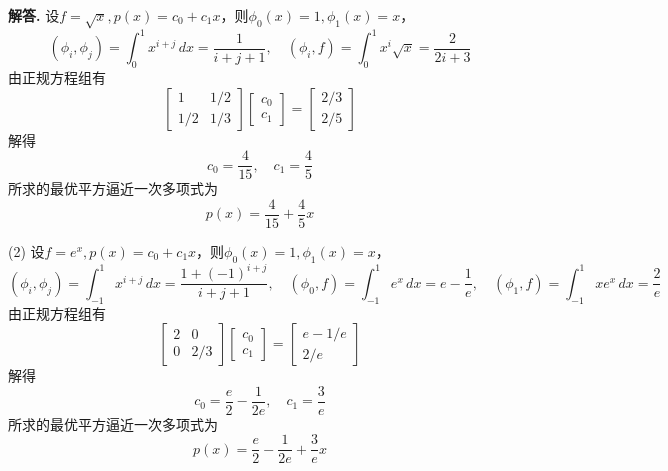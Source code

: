 \documentclass[12pt, a4paper, oneside]{ctexart}
\newenvironment{solution}{\par\noindent\textbf{解答. }}{\bigskip\par}
\begin{document}
\begin{solution}
    设$f=\sqrt{x}, p(x) = c_0+c_1x$，则$\phi_0(x) = 1,\phi_1(x) = x$，
    \begin{equation*}
        (\phi_i,\phi_j) = \int_0^1x^{i+j}\,dx = \frac{1}{i+j+1},\quad(\phi_i, f)=\int_0^1x^i\sqrt{x}=\frac{2}{2i+3}
    \end{equation*}
    由正规方程组有
    \begin{equation*}
        \left[\begin{matrix}
            1&1/2\\1/2&1/3
        \end{matrix}\right]\left[\begin{matrix}
            c_0\\c_1
        \end{matrix}\right]=\left[\begin{matrix}
            2/3\\2/5
        \end{matrix}\right]
    \end{equation*}
    解得
    \begin{equation*}
        c_0 = \frac{4}{15},\quad c_1 = \frac{4}{5}
    \end{equation*}
    所求的最优平方逼近一次多项式为
    \begin{equation*}
        p(x) = \frac{4}{15}+\frac{4}{5}x
    \end{equation*}

    (2) 设$f=e^{x}, p(x) = c_0+c_1x$，则$\phi_0(x) = 1,\phi_1(x) = x$，
    \begin{equation*}
        (\phi_i,\phi_j) = \int_{-1}^1x^{i+j}\,dx = \frac{1+(-1)^{i+j}}{i+j+1},\quad(\phi_0, f)=\int_{-1}^1e^x\,dx = e-\frac{1}{e},\quad (\phi_1,f)=\int_{-1}^1xe^x\,dx=\frac{2}{e}
    \end{equation*}
    由正规方程组有
    \begin{equation*}
        \left[\begin{matrix}
            2&0\\0&2/3
        \end{matrix}\right]\left[\begin{matrix}
            c_0\\c_1
        \end{matrix}\right]=\left[\begin{matrix}
            e-1/e\\2/e
        \end{matrix}\right]
    \end{equation*}
    解得
    \begin{equation*}
        c_0 = \frac{e}{2}-\frac{1}{2e},\quad c_1 = \frac{3}{e}
    \end{equation*}
    所求的最优平方逼近一次多项式为
    \begin{equation*}
        p(x) = \frac{e}{2}-\frac{1}{2e}+\frac{3}{e}x
    \end{equation*}
\end{solution}
\end{document}
